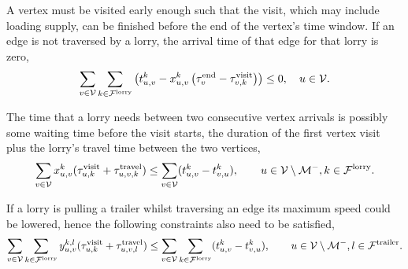 A vertex must be visited early enough such that the visit, which may include loading supply, can be finished before the end of the vertex's time window. If an edge is not traversed by a lorry, the arrival time of that edge for that lorry is zero,
\begin{align}
  \label{eq:time-window}
    \sum_{v \in \mathcal V} \sum_{k \in \mathcal F^{\rm lorry}}
    \left( t^k_{u,v}  -
     x^{k}_{u,v} \left(
    \tau^{\rm end}_v - \tau^{\rm visit}_{v,k}
    \right)  \right) \leq 0,
    \quad
    u \in  \mathcal V .
  \end{align}

The time that a lorry needs between two consecutive vertex arrivals is possibly some waiting time before the visit starts, the duration of the first vertex visit plus the lorry's travel time between the two vertices,
\begin{align}
  \label{eq:time-hard-first}
  \sum_{v\in \mathcal V} x_{u,v}^k (\tau_{u,k}^{\rm visit} + \tau_{u,v,k}^{\rm travel}) \leq \sum_{v \in \mathcal V} (t_{u,v}^k - t_{v,u}^k),
  \qquad u\in \mathcal V \setminus \mathcal M^-, k \in \mathcal{F}^{\rm lorry}.
\end{align}




If a lorry is pulling a trailer whilst traversing an edge its maximum speed could be lowered, hence the following constraints also need to be satisfied,
\begin{align}
  \sum_{v \in \mathcal V} \sum_{k \in \mathcal F^{\rm lorry}} y^{k,l}_{u,v} (\tau_{u,k}^{\rm visit} + \tau_{u,v,l}^{\rm travel}) \leq \sum_{v \in \mathcal V} \sum_{k \in \mathcal F^{\rm lorry}} (t_{u,v}^k - t_{v,u}^k),
  \qquad u\in \mathcal V \setminus \mathcal M^-, l \in \mathcal{F}^{\rm trailer}.
\end{align}

